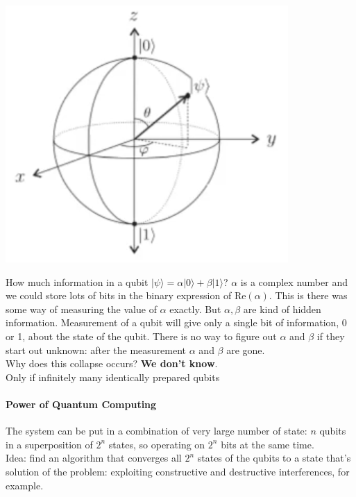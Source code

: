 \documentclass[10pt]{report}
\begin{document}
\begin{center}
	\includegraphics[scale=0.5]{5.png}
\end{center}
How much information in a qubit $|\psi\rangle = \alpha|0\rangle + \beta|1\rangle$? $\alpha$ is a complex number and we could store lots of bits in the binary expression of Re$(\alpha)$. This is there was some way of measuring the value of $\alpha$ exactly. But $\alpha,\beta$ are kind of hidden information. Measurement of a qubit will give only a single bit of information, 0 or 1, about the state of the qubit. There is no way to figure out $\alpha$ and $\beta$ if they start out unknown: after the measurement $\alpha$ and $\beta$ are gone.\\
Why does this collapse occurs? \textbf{We don't know}.\\
Only if infinitely many identically prepared qubits %
\paragraph{Power of Quantum Computing} The system can be put in a combination of very large number of state: $n$ qubits in a superposition of $2^n$ states, so operating on $2^n$ bits at the same time.\\
Idea: find an algorithm that converges all $2^n$ states of the qubits to a state that's solution of the problem: exploiting constructive and destructive interferences, for example.
\end{document}
